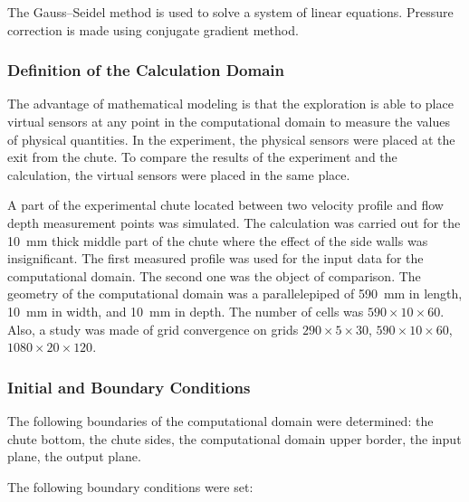 \documentclass[applsci,article,submit,moreauthors,pdftex]{Definitions/mdpi}
\begin{document}
The Gauss–Seidel method is used to solve a system of linear equations. Pressure correction is made using conjugate gradient method.

\subsubsection{Definition of the Calculation Domain}

The advantage of mathematical modeling is that the exploration is able to place virtual sensors at any point in the computational domain to measure the values of physical quantities. In the experiment, the physical sensors were placed at the exit from the chute. To compare the results of the experiment and the calculation, the virtual sensors were placed in the same place.

A part of the experimental chute located between two velocity profile and flow depth measurement points was simulated. The calculation was carried out for the 10~mm thick middle part of the chute where the effect of the side walls was insignificant. The first measured profile was used for the input data for the computational domain. The second one was the object of comparison. The geometry of the computational domain was a parallelepiped of 590~mm in length, 10~mm in width, and 10~mm in depth. The number of cells was $590 \times 10 \times 60$. Also, a study was made of grid convergence on grids $290 \times 5 \times 30$, $590 \times 10 \times 60$, $1080 \times 20 \times 120$.

\subsubsection{Initial and Boundary Conditions}

The following boundaries of the computational domain were determined: the chute bottom, the chute sides, the computational domain upper border, the input plane, the output plane.

The following boundary conditions were set:
\end{document}
